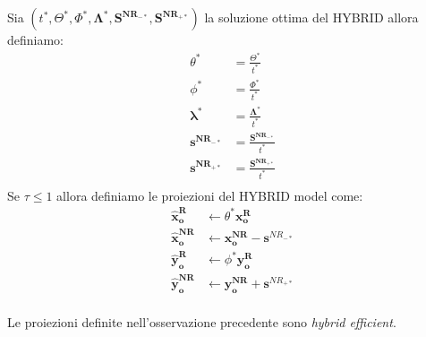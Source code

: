 \begin{oss} Sia $(t^*, \Theta^*, \Phi^*, \boldsymbol{\Lambda^*, S^{NR_{-*}}, S^{NR_{+*}}})$ la soluzione ottima del HYBRID allora definiamo:
\begin{equation}
\begin{split}
\theta^* & = \frac{\Theta^*}{t^*} \\
\phi^* & = \frac{\Phi^*}{t^*} \\
\boldsymbol{\lambda}^* & = \frac{\boldsymbol{\Lambda}^*}{t^*} \\
\boldsymbol{s^{NR_{-*}}} & = \frac{\boldsymbol{S^{NR_{-*}}}}{t^*} \\
\boldsymbol{s^{NR_{+*}}} & = \frac{\boldsymbol{S^{NR_{+*}}}}{t^*} \\
\end{split}
\end{equation}
Se $\tau \leq 1$ allora definiamo le proiezioni del HYBRID model come:
\begin{equation}
\begin{split}
\boldsymbol{\hat{x}_o^R} & \longleftarrow \theta^* \boldsymbol{x_o^R} \\
\boldsymbol{\hat{x}_o^{NR}} & \longleftarrow \boldsymbol{x_o^{NR}} - \boldsymbol{s}^{NR_{-*}}\\
\boldsymbol{\hat{y}_o^R} & \longleftarrow \phi^* \boldsymbol{y_o^R} \\
\boldsymbol{\hat{y}_o^{NR}} & \longleftarrow \boldsymbol{y_o^{NR}} + \boldsymbol{s}^{NR_{+*}}\\
\end{split}
\end{equation}
\end{oss}
\begin{teor} Le proiezioni definite nell'osservazione precedente sono \emph{hybrid efficient}.
\end{teor}
